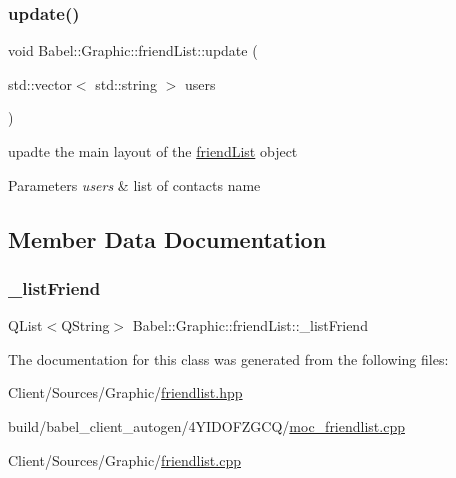 \subsubsection{\texorpdfstring{update()}{update()}}
{\footnotesize\ttfamily void Babel\+::\+Graphic\+::friend\+List\+::update (\begin{DoxyParamCaption}\item[{std\+::vector$<$ std\+::string $>$}]{users }\end{DoxyParamCaption})}

upadte the main layout of the \hyperlink{classBabel_1_1Graphic_1_1friendList}{friend\+List} object 
\begin{DoxyParams}{Parameters}
{\em users} & list of contact\textquotesingle{}s name \\
\hline
\end{DoxyParams}


\subsection{Member Data Documentation}
\mbox{\label{classBabel_1_1Graphic_1_1friendList_a405ffc3f0fb75d3c3472acb3b118fbbb}} 
\subsubsection{\texorpdfstring{\+\_\+list\+Friend}{\_listFriend}}
{\footnotesize\ttfamily Q\+List$<$Q\+String$>$ Babel\+::\+Graphic\+::friend\+List\+::\+\_\+list\+Friend}



The documentation for this class was generated from the following files\+:\begin{DoxyCompactItemize}
\item 
Client/\+Sources/\+Graphic/\hyperlink{friendlist_8hpp}{friendlist.\+hpp}\item 
build/babel\+\_\+client\+\_\+autogen/4\+Y\+I\+D\+O\+F\+Z\+G\+C\+Q/\hyperlink{build_2babel__client__autogen_24YIDOFZGCQ_2moc__friendlist_8cpp}{moc\+\_\+friendlist.\+cpp}\item 
Client/\+Sources/\+Graphic/\hyperlink{friendlist_8cpp}{friendlist.\+cpp}\end{DoxyCompactItemize}
